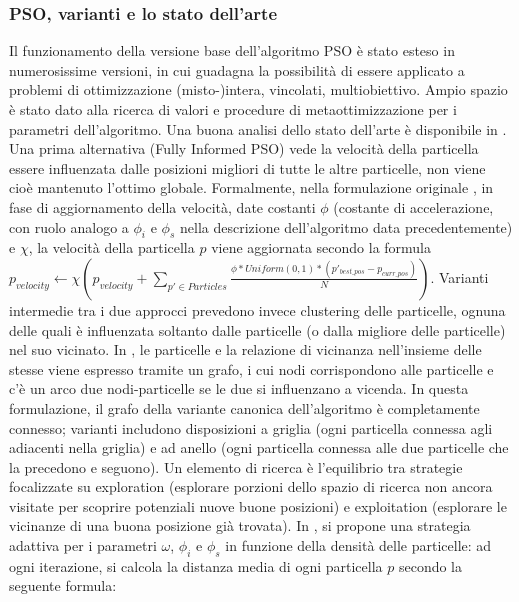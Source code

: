 \documentclass[12pt]{article}
\begin{document}
\subsubsection*{PSO, varianti e lo stato dell'arte}

Il funzionamento della versione base dell'algoritmo PSO è stato esteso in numerosissime versioni, in cui guadagna la possibilità di essere applicato a problemi di ottimizzazione (misto-)intera, vincolati, multiobiettivo. Ampio spazio è stato dato alla ricerca di valori e procedure di metaottimizzazione per i parametri dell'algoritmo. Una buona analisi dello stato dell'arte è disponibile in \cite{ChengAl2018}. \newline
\newline
Una prima alternativa (Fully Informed PSO) vede la velocità della particella essere influenzata dalle posizioni migliori di tutte le altre particelle, non viene cioè mantenuto l'ottimo globale. Formalmente, nella formulazione originale \cite{MendesAl2004}, in fase di aggiornamento della velocità, date costanti $\phi$ (costante di accelerazione, con ruolo analogo a $\phi_i$ e $\phi_s$ nella descrizione dell'algoritmo data precedentemente) e $\chi$, la velocità della particella $p$ viene aggiornata secondo la formula \newline
\newline
$p_{velocity} \leftarrow \chi \left( p_{velocity} + \sum_{p' \in Particles} \frac{\displaystyle \phi*Uniform(0,1)*\left( p'_{best\_pos} - p_{curr\_pos}\right)}{\displaystyle N} \right)$. \newline
\newline
Varianti intermedie tra i due approcci prevedono invece clustering delle particelle, ognuna delle quali è influenzata soltanto dalle particelle (o dalla migliore delle particelle) nel suo vicinato. In \cite{KennedyMendes2003}, le particelle e la relazione di vicinanza nell'insieme delle stesse viene espresso tramite un grafo, i cui nodi corrispondono alle particelle e c'è un arco due nodi-particelle se le due si influenzano a vicenda. In questa formulazione, il grafo della variante canonica dell'algoritmo è completamente connesso; varianti includono disposizioni a griglia (ogni particella connessa agli adiacenti nella griglia) e ad anello (ogni particella connessa alle due particelle che la precedono e seguono).\newline
\newline
Un elemento di ricerca è l'equilibrio tra strategie focalizzate su exploration (esplorare porzioni dello spazio di ricerca non ancora visitate per scoprire potenziali nuove buone posizioni) e exploitation (esplorare le vicinanze di una buona posizione già trovata). In \cite{ZhanAl2009}, si propone una strategia adattiva per i parametri $\omega$, $\phi_i$ e $\phi_s$ in funzione della densità delle particelle: ad ogni iterazione, si calcola la distanza media di ogni particella $p$ secondo la seguente formula: \newline
\end{document}
